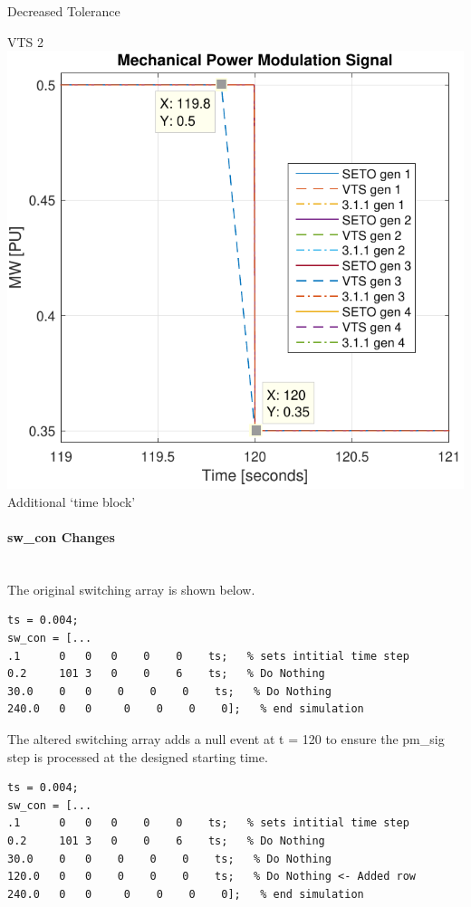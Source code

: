 \documentclass[12pt]{article}
\begin{document}
\begin{center}
\begin{minipage}{.3\linewidth}
Decreased Tolerance 
\end{minipage} %
\begin{minipage}{.3\linewidth}
\centering
VTS 2
\includegraphics[width=\linewidth]{pmSig_2}
Additional `time block'
\end{minipage}
\end{center}
\pagebreak
\paragraph{sw\_con Changes} \ \\
The original switching array is shown below.
\begin{verbatim}
ts = 0.004;
sw_con = [...
.1      0  	0  	0    0    0    ts;   % sets intitial time step
0.2     101	3  	0    0    6    ts;   % Do Nothing
30.0    0  	0 	 0    0    0    ts;   % Do Nothing
240.0   0  	0	  0    0    0    0];   % end simulation
\end{verbatim}
The altered switching array adds a null event at t = 120 to ensure the pm\_sig step is processed at the designed starting time.

\begin{verbatim}
ts = 0.004;
sw_con = [...
.1      0  	0  	0    0    0    ts;   % sets intitial time step
0.2     101	3  	0    0    6    ts;   % Do Nothing
30.0    0  	0 	 0    0    0    ts;   % Do Nothing
120.0   0  	0 	 0    0    0    ts;   % Do Nothing <- Added row
240.0   0  	0	  0    0    0    0];   % end simulation
\end{verbatim}
\end{document}
